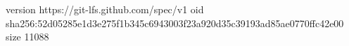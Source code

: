 version https://git-lfs.github.com/spec/v1
oid sha256:52d05285e1d3e275f1b345c6943003f23a920d35c39193ad85ae0770ffc42e00
size 11088
